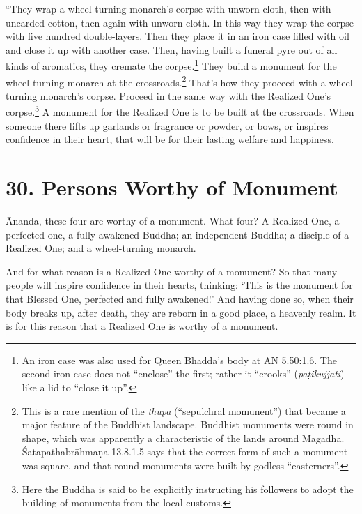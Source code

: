 \documentclass[12pt,openany]{book}%
\begin{document}
“They wrap a wheel-turning monarch’s corpse with unworn cloth, then with uncarded cotton, then again with unworn cloth. In this way they wrap the corpse with five hundred double-layers. Then they place it in an iron case filled with oil and close it up with another case. Then, having built a funeral pyre out of all kinds of aromatics, they cremate the corpse.\footnote{An iron case was also used for Queen \textsanskrit{Bhaddā}’s body at \href{https://suttacentral.net/an5.50/en/sujato\#1.6}{AN 5.50:1.6}. The second iron case does not “enclose” the first; rather it “crooks” (\textit{\textsanskrit{paṭikujjati}}) like a lid to “close it up”. } They build a monument for the wheel-turning monarch at the crossroads.\footnote{This is a rare mention of the \textit{\textsanskrit{thūpa}} (“sepulchral momunent”) that became a major feature of the Buddhist landscape. Buddhist monuments were round in shape, which was apparently a characteristic of the lands around Magadha. \textsanskrit{Śatapathabrāhmaṇa} 13.8.1.5 says that the correct form of such a monument was square, and that round monuments were built by godless “easterners”. } That’s how they proceed with a wheel-turning monarch’s corpse. Proceed in the same way with the Realized One’s corpse.\footnote{Here the Buddha is said to be explicitly instructing his followers to adopt the building of monuments from the local customs. } A monument for the Realized One is to be built at the crossroads. When someone there lifts up garlands or fragrance or powder, or bows, or inspires confidence in their heart, that will be for their lasting welfare and happiness. 

\section*{30. Persons Worthy of Monument }

Ānanda, these four are worthy of a monument. What four? A Realized One, a perfected one, a fully awakened Buddha; an independent Buddha; a disciple of a Realized One; and a wheel-turning monarch. 

And for what reason is a Realized One worthy of a monument? So that many people will inspire confidence in their hearts, thinking: ‘This is the monument for that Blessed One, perfected and fully awakened!’ And having done so, when their body breaks up, after death, they are reborn in a good place, a heavenly realm. It is for this reason that a Realized One is worthy of a monument. 
\end{document}

